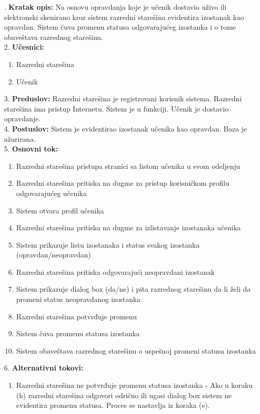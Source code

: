 \documentclass{article}
\begin{document}
. \textbf{Kratak opis:} Na osnovu opravdanja koje je učenik dostavio uživo ili elektronski skenirano kroz sistem razredni starešina evidentira izostanak kao opravdan. Sistem čuva promenu statusa odgovarajućeg izostanka i o tome obaveštava razrednog starešinu. \\

2. \textbf{Učesnici:}
\begin{enumerate} [label=(\alph*)]
\item Razredni starešina
\item Učenik
\end{enumerate} 

3. \textbf{Preduslov:} Razredni starešina je registrovani korisnik sistema. Razredni starešina ima pristup Internetu. Sistem je u funkciji. Učenik je dostavio opravdanje. \\

4. \textbf{Postuslov:} Sistem je evidentirao izostanak učenika kao opravdan. Baza je ažurirana. \\

5. \textbf{Osnovni tok:} 
\begin{enumerate} [label=(\alph*)]
\item Razredni starešina pristupa stranici sa listom učenika u svom odeljenju
\item Razredni starešina pritiska na dugme za pristup korisničkom profilu odgovarajućeg učenika
\item Sistem otvara profil učenika
\item Razredni starešina pritiska na dugme za izlistavanje izostanaka učenika
\item Sistem prikazuje listu izostanaka i status svakog izostanka (opravdan/neopravdan)
\item Razredni starešina pritiska odgovarajući neopravdani izostanak
\item Sistem prikazuje dialog box (da/ne) i pita razrednog starešinu da li želi da promeni status neopravdanog izostanka
\item Razredni starešina potvrđuje promenu
\item Sistem čuva promenu statusa izostanka
\item Sistem obaveštava razrednog starešinu o uspešnoj promeni statusa izostanka
\end{enumerate}

6. \textbf{Alternativni tokovi:}
\begin{enumerate} [label=(\roman*)]
\item Razredni starešina ne potvrđuje promenu statusa izostanka - Ako u koraku (h) razredni starešina odgovori odrično ili ugasi dialog box sistem ne evidentira promenu statusa. Proces se nastavlja iz koraka (e). 
\end{enumerate}
\end{document}
